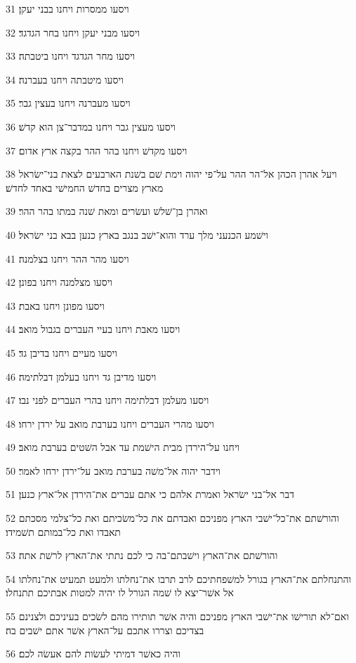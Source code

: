 \par 31 ויסעו ממסרות ויחנו בבני יעקן׃
\par 32 ויסעו מבני יעקן ויחנו בחר הגדגד׃
\par 33 ויסעו מחר הגדגד ויחנו ביטבתה׃
\par 34 ויסעו מיטבתה ויחנו בעברנה׃
\par 35 ויסעו מעברנה ויחנו בעצין גבר׃
\par 36 ויסעו מעצין גבר ויחנו במדבר־צן הוא קדשׁ׃
\par 37 ויסעו מקדשׁ ויחנו בהר ההר בקצה ארץ אדום׃
\par 38 ויעל אהרן הכהן אל־הר ההר על־פי יהוה וימת שׁם בשׁנת הארבעים לצאת בני־ישׂראל מארץ מצרים בחדשׁ החמישׁי באחד לחדשׁ׃
\par 39 ואהרן בן־שׁלשׁ ועשׂרים ומאת שׁנה במתו בהר ההר׃
\par 40 וישׁמע הכנעני מלך ערד והוא־ישׁב בנגב בארץ כנען בבא בני ישׂראל׃
\par 41 ויסעו מהר ההר ויחנו בצלמנה׃
\par 42 ויסעו מצלמנה ויחנו בפונן׃
\par 43 ויסעו מפונן ויחנו באבת׃
\par 44 ויסעו מאבת ויחנו בעיי העברים בגבול מואב׃
\par 45 ויסעו מעיים ויחנו בדיבן גד׃
\par 46 ויסעו מדיבן גד ויחנו בעלמן דבלתימה׃
\par 47 ויסעו מעלמן דבלתימה ויחנו בהרי העברים לפני נבו׃
\par 48 ויסעו מהרי העברים ויחנו בערבת מואב על ירדן ירחו׃
\par 49 ויחנו על־הירדן מבית הישׁמת עד אבל השׁטים בערבת מואב׃
\par 50 וידבר יהוה אל־משׁה בערבת מואב על־ירדן ירחו לאמר׃
\par 51 דבר אל־בני ישׂראל ואמרת אלהם כי אתם עברים את־הירדן אל־ארץ כנען׃
\par 52 והורשׁתם את־כל־ישׁבי הארץ מפניכם ואבדתם את כל־משׂכיתם ואת כל־צלמי מסכתם תאבדו ואת כל־במותם תשׁמידו׃
\par 53 והורשׁתם את־הארץ וישׁבתם־בה כי לכם נתתי את־הארץ לרשׁת אתה׃
\par 54 והתנחלתם את־הארץ בגורל למשׁפחתיכם לרב תרבו את־נחלתו ולמעט תמעיט את־נחלתו אל אשׁר־יצא לו שׁמה הגורל לו יהיה למטות אבתיכם תתנחלו׃
\par 55 ואם־לא תורישׁו את־ישׁבי הארץ מפניכם והיה אשׁר תותירו מהם לשׂכים בעיניכם ולצנינם בצדיכם וצררו אתכם על־הארץ אשׁר אתם ישׁבים בה׃
\par 56 והיה כאשׁר דמיתי לעשׂות להם אעשׂה לכם׃

